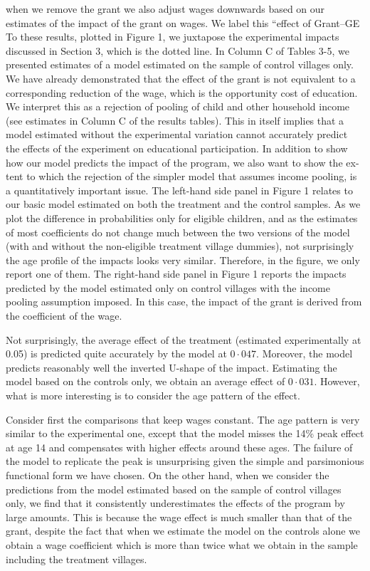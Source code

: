 \documentclass{handoutForSolutions}
\begin{document}
when we remove the grant we also adjust wages downwards based on our estimates of the impact of the grant on wages. We label this ``effect of Grant--GE To these results, plotted in Figure 1, we juxtapose the experimental impacts discussed in Section 3, which is the dotted line.
In Column $\mathrm{C}$ of Tables 3-5, we presented estimates of a model estimated on the sample of control villages only. We have already demonstrated that the effect of the grant is not equivalent to a corresponding reduction of the wage, which is the opportunity cost of education. We interpret this as a rejection of pooling of child and other household income (see estimates in Column $\mathrm{C}$ of the results tables). This in itself implies that a model estimated without the experimental variation cannot accurately predict the effects of the experiment on educational participation. In addition to show how our model predicts the impact of the program, we also want to show the ex- tent to which the rejection of the simpler model that assumes income pooling, is a quantitatively important issue.
The left-hand side panel in Figure 1 relates to our basic model estimated on both the treatment and the control samples. As we plot the difference in probabilities only for eligible children, and as the estimates of most coefficients do not change much between the two versions of the model (with and without the non-eligible treatment village dummies), not surprisingly the age profile of the impacts looks very similar. Therefore, in the figure, we only report one of them.
The right-hand side panel in Figure 1 reports the impacts predicted by the model estimated only on control villages with the income pooling assumption imposed. In this case, the impact of the grant is derived from the coefficient of the wage.

Not surprisingly, the average effect of the treatment (estimated experimentally at 0.05) is predicted quite accurately by the model at $0\cdot 047$. Moreover, the model predicts reasonably well the inverted $\mathrm{U}$-shape of the impact. Estimating the model based on the controls only, we obtain an average effect of $0\cdot 031$. However, what is more interesting is to consider the age pattern of the effect.

Consider first the comparisons that keep wages constant. The age pattern is very similar to the experimental one, except that the model misses the 14\% peak effect at age 14 and compensates with higher effects around these ages. The failure of the model to replicate the peak is unsurprising given the simple and parsimonious functional form we have chosen. On the other hand, when we consider the predictions from the model estimated based on the sample of control villages only, we find that it consistently underestimates the effects of the program by large amounts. This is because the wage effect is much smaller than that of the grant, despite the fact that when we estimate the model on the controls alone we obtain a wage coefficient which is more than twice what we obtain in the sample including the treatment villages.
\end{document}
